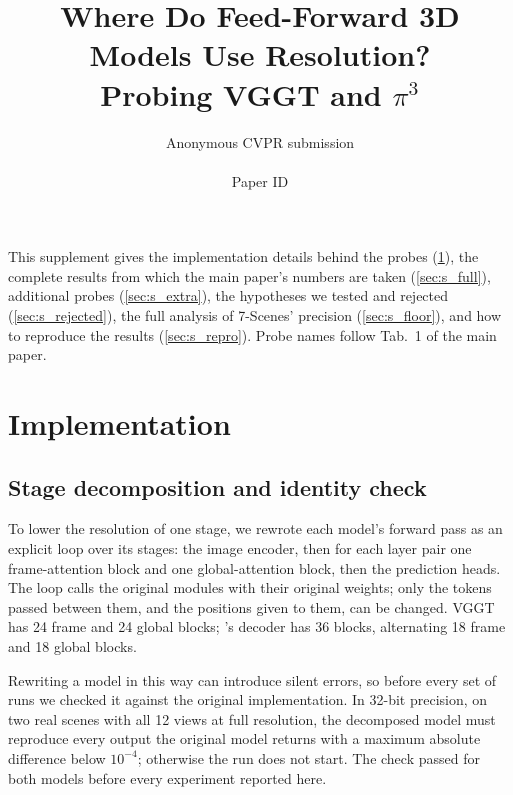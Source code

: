 \documentclass[10pt,twocolumn,letterpaper]{article}
\title{Where Do Feed-Forward 3D Models Use Resolution?\\Probing VGGT and $\pi^3$}
\author{Anonymous CVPR submission\\\\Paper ID \paperID}
\begin{document}
\maketitlesupplementary

\appendix

\noindent This supplement gives the implementation details behind the probes (\cref{sec:s_impl}), the complete results from which the main paper's numbers are taken (\cref{sec:s_full}), additional probes (\cref{sec:s_extra}), the hypotheses we tested and rejected (\cref{sec:s_rejected}), the full analysis of 7-Scenes' precision (\cref{sec:s_floor}), and how to reproduce the results (\cref{sec:s_repro}). Probe names follow Tab.~1 of the main paper.

\section{Implementation}
\label{sec:s_impl}

\subsection{Stage decomposition and identity check}
To lower the resolution of one stage, we rewrote each model's forward pass as an explicit loop over its stages: the image encoder, then for each layer pair one frame-attention block and one global-attention block, then the prediction heads. The loop calls the original modules with their original weights; only the tokens passed between them, and the positions given to them, can be changed. VGGT has 24 frame and 24 global blocks; \pithree's decoder has 36 blocks, alternating 18 frame and 18 global blocks.

Rewriting a model in this way can introduce silent errors, so before every set of runs we checked it against the original implementation. In 32-bit precision, on two real scenes with all 12 views at full resolution, the decomposed model must reproduce every output the original model returns with a maximum absolute difference below $10^{-4}$; otherwise the run does not start. The check passed for both models before every experiment reported here.
\end{document}
